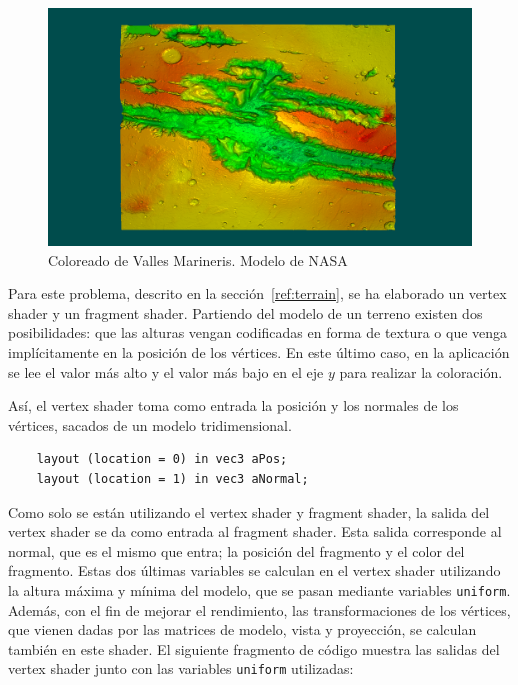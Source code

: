 \begin{figure}[h]
	\centering
	\includegraphics[width=\textwidth]{figures/myterrain.png}
	\caption{Coloreado de Valles Marineris. Modelo de NASA~\cite{NASA}}
	\label{fig:myterrain}
\end{figure}

Para este problema, descrito en la sección~\ref{ref:terrain}, se ha elaborado un
vertex shader y un fragment shader. Partiendo del modelo de un terreno existen
dos posibilidades: que las alturas vengan codificadas en forma de textura o que
venga implícitamente en la posición de los vértices. En este último caso, en la
aplicación se lee el valor más alto y el valor más bajo en el eje $y$ para
realizar la coloración. 

Así, el vertex shader toma como entrada la posición y los normales de los
vértices, sacados de un modelo tridimensional.

\begin{verbatim}
    layout (location = 0) in vec3 aPos;
    layout (location = 1) in vec3 aNormal;
\end{verbatim}

Como solo se están utilizando el vertex shader y fragment shader, la salida del
vertex shader se da como entrada al fragment shader. Esta salida corresponde al
normal, que es el mismo que entra; la posición del fragmento y el color del
fragmento. Estas dos últimas variables se calculan en el vertex shader
utilizando la altura máxima y mínima del modelo, que se pasan mediante variables
\verb|uniform|.  Además, con el fin de mejorar el rendimiento, las
transformaciones de los vértices, que vienen dadas por las matrices de modelo,
vista y proyección, se calculan también en este shader. El siguiente fragmento
de código muestra las salidas del vertex shader junto con las variables
\verb|uniform| utilizadas:

